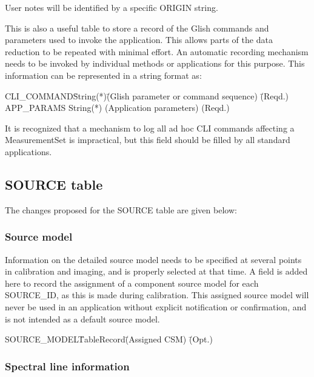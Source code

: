 \documentclass{article}
\begin{document}
\begin{itemize}
User notes will be identified by a specific ORIGIN string.

This is also a useful table to store a record of the Glish commands
and parameters used to invoke the application. This allows parts of
the data reduction to be repeated with minimal effort. An automatic
recording mechanism needs to be invoked by individual methods or
applications for this purpose. This information can be represented in
a string format as:

\begin{tabbing}
CLI\_COMMAND\quad\quad \= String(*)\quad\quad \= 
(Glish parameter or command sequence)
 \quad\quad \= (Reqd.) \\
APP\_PARAMS \> String(*) \> (Application parameters) \> (Reqd.)
\end{tabbing}

 It is recognized that a mechanism to log all ad hoc CLI commands
affecting a MeasurementSet is impractical, but this field should be
filled by all standard applications.

\subsection{SOURCE table}

The changes proposed for the SOURCE table are given below:

\subsubsection{Source model}

Information on the detailed source model needs to be specified at
several points in calibration and imaging, and is properly selected at
that time. A field is added here to record the assignment of a
component source model for each SOURCE\_ID, as this is made during
calibration. This assigned source model will never be used in an
application without explicit notification or confirmation, and is not
intended as a default source model.

\begin{tabbing}
SOURCE\_MODEL\quad\quad \= TableRecord\quad\quad \= 
(Assigned CSM) \quad\quad \= (Opt.) \\
\end{tabbing}

\subsubsection{Spectral line information}


\end{itemize}
\end{document}
